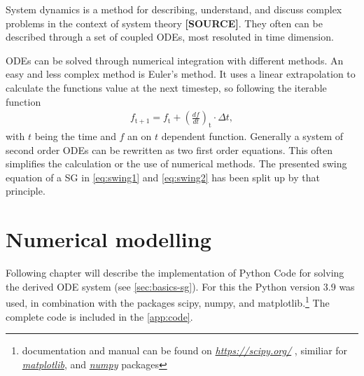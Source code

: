 System dynamics is a method for describing, understand, and discuss complex problems in the context of system theory \textbf{[SOURCE]}. They often can be described through a set of coupled \acfp{ODE}, most resoluted in time dimension.  

\acsp{ODE} can be solved through numerical integration with different methods. An easy and less complex method is Euler's method. It uses a linear extrapolation to calculate the functions value at the next timestep, so following the iterable function
\begin{align}
        f_\mathrm{t+1}=f_\mathrm{t}+\left(\frac{df}{dt}\right)_\mathrm{t} \cdot \Delta t \label{eq:euler},
\end{align}
with $t$ being the time and $f$ an on $t$ dependent function. Generally a system of second order \acsp{ODE} can be rewritten as two first order equations. This often simplifies the calculation or the use of numerical methods. The presented swing equation of a \acs{SG} in \autoref{eq:swing1} and \autoref{eq:swing2} has been split up by that principle.  

\chapter{Numerical modelling}
\label{chap:methods}

Following chapter will describe the implementation of Python Code for solving the derived \acs{ODE} system (see \autoref{sec:basics-sg}). For this the Python version 3.9 was used, in combination with the packages scipy, numpy, and matplotlib.\footnote{documentation and manual can be found on \href{https://scipy.org/}{\itshape https://scipy.org/} \autocite{virtanenSciPyFundamentalAlgorithms2020}, similiar for \href{https://matplotlib.org/}{\itshape matplotlib}, and \href{https://numpy.org/}{\itshape numpy} packages} The complete code is included in the \autoref{app:code}. 

